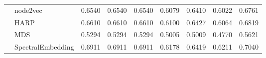\begin{table}[h]
{\begin{tabular}{ll|rrr|rrr|r}
 & node2vec & 0.6540 & 0.6540 & 0.6540 & 0.6079 & 0.6410 & 0.6022 & 0.6761 \\
 & HARP & 0.6610 & 0.6610 & 0.6610 & 0.6100 & \cellcolor{yellow!75}0.6427 & 0.6064 & 0.6819 \\
 & MDS & 0.5294 & 0.5294 & 0.5294 & 0.5005 & 0.5009 & 0.4770 & 0.5621 \\
 & SpectralEmbedding & \cellcolor{yellow!75} 0.6911 & \cellcolor{yellow!75} 0.6911 & \cellcolor{yellow!75} 0.6911 & \cellcolor{yellow!75} 0.6178 & 0.6419 & \cellcolor{yellow!75} 0.6211 & \cellcolor{yellow!75} 0.7040 \\
\bottomrule
\end{tabular}
}
\end{table}
